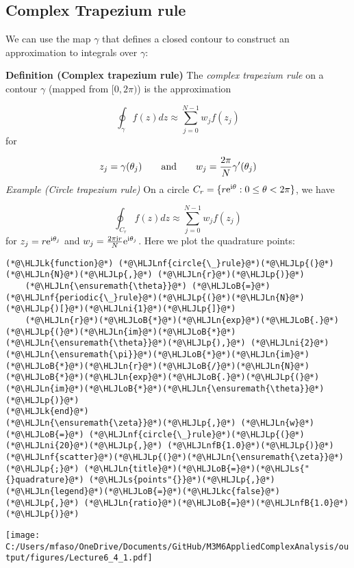\documentclass[12pt,landscape]{article}
\newcommand{\HLJLk}[1]{\textcolor[RGB]{148,91,176}{\textbf{#1}}}
\newcommand{\HLJLkc}[1]{\textcolor[RGB]{59,151,46}{\textit{#1}}}
\newcommand{\HLJLn}[1]{#1}
\newcommand{\HLJLnf}[1]{\textcolor[RGB]{66,102,213}{#1}}
\newcommand{\HLJLs}[1]{\textcolor[RGB]{201,61,57}{#1}}
\newcommand{\HLJLnfB}[1]{\textcolor[RGB]{59,151,46}{#1}}
\newcommand{\HLJLni}[1]{\textcolor[RGB]{59,151,46}{#1}}
\newcommand{\HLJLoB}[1]{\textcolor[RGB]{102,102,102}{\textbf{#1}}}
\newcommand{\HLJLp}[1]{#1}
\def\I{ {\rm i} }
\def\E{ {\rm e} }
\def\cent#1{\begin{center}#1\end{center} }
\begin{document}
{\subsection{Complex Trapezium rule}
We can use the map $\gamma$ that defines a closed contour to construct an approximation to integrals over $\gamma$:

\textbf{Definition (Complex trapezium rule)} The \emph{complex trapezium rule} on a contour $\gamma$ (mapped from $[0,2\pi)$) is the approximation

\[
\oint_\gamma f(z) dz \approx  \sum_{j=0}^{N-1} w_j f(z_j)
\]
for

\[
z_j = \gamma(\theta_j) \qquad\hbox{and}\qquad w_j = {2\pi \over N} \gamma'(\theta_j)
\]
\emph{Example (Circle trapezium rule)} On a circle $C_r = \{r \E^{\I \theta} : 0 \leq \theta < 2 \pi\}$, we have

\[
\oint_{C_r} f(z) dz \approx  \sum_{j=0}^{N-1} w_j f(z_j)
\]
for $z_j = r \E^{\I \theta_j}$ and $w_j = {2 \pi \I r \over N}  \E^{\I \theta_j}$.
\newpage
Here we plot the quadrature points:


\begin{lstlisting}
(*@\HLJLk{function}@*) (*@\HLJLnf{circle{\_}rule}@*)(*@\HLJLp{(}@*)(*@\HLJLn{N}@*)(*@\HLJLp{,}@*) (*@\HLJLn{r}@*)(*@\HLJLp{)}@*)
    (*@\HLJLn{\ensuremath{\theta}}@*) (*@\HLJLoB{=}@*) (*@\HLJLnf{periodic{\_}rule}@*)(*@\HLJLp{(}@*)(*@\HLJLn{N}@*)(*@\HLJLp{)[}@*)(*@\HLJLni{1}@*)(*@\HLJLp{]}@*)
    (*@\HLJLn{r}@*)(*@\HLJLoB{*}@*)(*@\HLJLn{exp}@*)(*@\HLJLoB{.}@*)(*@\HLJLp{(}@*)(*@\HLJLn{im}@*)(*@\HLJLoB{*}@*)(*@\HLJLn{\ensuremath{\theta}}@*)(*@\HLJLp{),}@*) (*@\HLJLni{2}@*)(*@\HLJLn{\ensuremath{\pi}}@*)(*@\HLJLoB{*}@*)(*@\HLJLn{im}@*)(*@\HLJLoB{*}@*)(*@\HLJLn{r}@*)(*@\HLJLoB{/}@*)(*@\HLJLn{N}@*)(*@\HLJLoB{*}@*)(*@\HLJLn{exp}@*)(*@\HLJLoB{.}@*)(*@\HLJLp{(}@*)(*@\HLJLn{im}@*)(*@\HLJLoB{*}@*)(*@\HLJLn{\ensuremath{\theta}}@*)(*@\HLJLp{)}@*)
(*@\HLJLk{end}@*)
(*@\HLJLn{\ensuremath{\zeta}}@*)(*@\HLJLp{,}@*) (*@\HLJLn{w}@*) (*@\HLJLoB{=}@*) (*@\HLJLnf{circle{\_}rule}@*)(*@\HLJLp{(}@*)(*@\HLJLni{20}@*)(*@\HLJLp{,}@*) (*@\HLJLnfB{1.0}@*)(*@\HLJLp{)}@*)
(*@\HLJLnf{scatter}@*)(*@\HLJLp{(}@*)(*@\HLJLn{\ensuremath{\zeta}}@*)(*@\HLJLp{;}@*) (*@\HLJLn{title}@*)(*@\HLJLoB{=}@*)(*@\HLJLs{"{}quadrature}@*) (*@\HLJLs{points"{}}@*)(*@\HLJLp{,}@*) (*@\HLJLn{legend}@*)(*@\HLJLoB{=}@*)(*@\HLJLkc{false}@*)(*@\HLJLp{,}@*) (*@\HLJLn{ratio}@*)(*@\HLJLoB{=}@*)(*@\HLJLnfB{1.0}@*)(*@\HLJLp{)}@*)
\end{lstlisting}

\cent{\texttt{[image: C:/Users/mfaso/OneDrive/Documents/GitHub/M3M6AppliedComplexAnalysis/output/figures/Lecture6\_4\_1.pdf]}}

}
\end{document}
